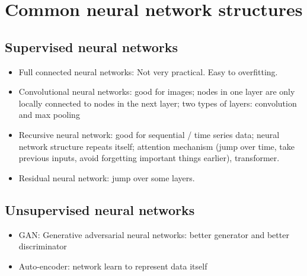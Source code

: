 \documentclass[twoside,12pt]{article}
\begin{document}
\section{Common neural network structures}
\subsection{Supervised neural networks}
\begin{itemize}
\item Full connected neural networks: Not very practical. Easy to overfitting.
\item Convolutional neural networks: good for images; nodes in one layer are only locally connected to nodes in the next layer; two types of layers: convolution and max pooling
\item Recursive neural network: good for sequential / time series data; neural network structure repeats itself; attention mechanism (jump over time, take previous inputs, avoid forgetting important things earlier), transformer. 
\item Residual neural network: jump over some layers. 
\end{itemize}
\subsection{Unsupervised neural networks}
\begin{itemize}
\item GAN: Generative adversarial neural networks: better generator and better discriminator 
\item Auto-encoder: network learn to represent data itself
\end{itemize}

\end{document}
